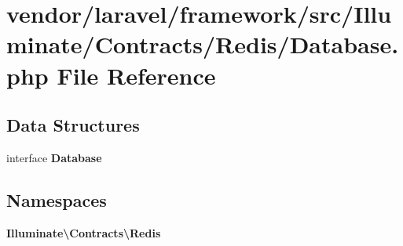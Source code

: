 \section{vendor/laravel/framework/src/\+Illuminate/\+Contracts/\+Redis/\+Database.php File Reference}
\label{vendor_2laravel_2framework_2src_2_illuminate_2_contracts_2_redis_2database_8php}
\subsection*{Data Structures}
\begin{DoxyCompactItemize}
\item 
interface {\bf Database}
\end{DoxyCompactItemize}
\subsection*{Namespaces}
\begin{DoxyCompactItemize}
\item 
 {\bf Illuminate\textbackslash{}\+Contracts\textbackslash{}\+Redis}
\end{DoxyCompactItemize}

